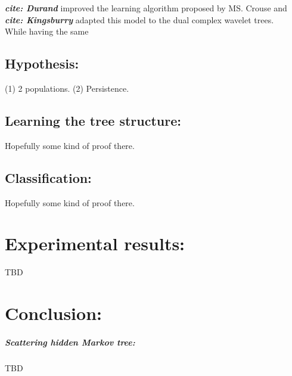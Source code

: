\documentclass[a4paper,11pt]{report}
\begin{document}
{\begin{itemize}
			
				
				
			

      
    \end{itemize}

    
    \textbf{\textit{cite: Durand}} improved the learning algorithm proposed by MS. Crouse and \textbf{\textit{cite: Kingsburry}} adapted this model to the dual complex wavelet trees.\\
    
    While having the same 
    
  \section{Hypothesis:}
    \label{seq:SHMT/Hypos}
    (1) 2 populations. (2) Persistence. 
      
    
  \section{Learning the tree structure:}
    \label{seq:SHMT/Learning}
    Hopefully some kind of proof there.
    
  \section{Classification:}
    \label{seq:SHMT/Clf}
    Hopefully some kind of proof there.

\chapter{Experimental results:}
  \label{chap:Experimental results}
  TBD
  
\chapter{Conclusion:}
  \paragraph{Scattering hidden Markov tree:}
    TBD
}
\end{document}

